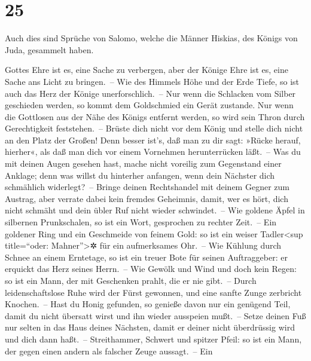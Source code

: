 \hypertarget{section-24}{%
\section{25}\label{section-24}}

Auch dies sind Sprüche von Salomo, welche die Männer
Hiskias, des Königs von Juda, gesammelt haben.

Gottes Ehre ist es, eine Sache zu verbergen, aber der
Könige Ehre ist es, eine Sache ans Licht zu bringen.~--
Wie des Himmels Höhe und der Erde Tiefe, so ist auch das
Herz der Könige unerforschlich.~-- Nur wenn die Schlacken
vom Silber geschieden werden, so kommt dem Goldschmied ein Gerät
zustande. Nur wenn die Gottlosen aus der Nähe des Königs
entfernt werden, so wird sein Thron durch Gerechtigkeit feststehen.~--
Brüste dich nicht vor dem König und stelle dich nicht an
den Platz der Großen! Denn besser ist's, daß man zu dir
sagt: »Rücke herauf, hierher«, als daß man dich vor einem Vornehmen
herunterrücken läßt.~-- Was du mit deinen Augen gesehen
hast, mache nicht voreilig zum Gegenstand einer Anklage; denn was willst
du hinterher anfangen, wenn dein Nächster dich schmählich widerlegt?~--
Bringe deinen Rechtshandel mit deinem Gegner zum Austrag,
aber verrate dabei kein fremdes Geheimnis, damit, wer es
hört, dich nicht schmäht und dein übler Ruf nicht wieder schwindet.~--
Wie goldene Äpfel in silbernen Prunkschalen, so ist ein
Wort, gesprochen zu rechter Zeit.~-- Ein goldener Ring
und ein Geschmeide von feinem Gold: so ist ein weiser
Tadler\textless sup title=``oder: Mahner''\textgreater✲ für ein
aufmerksames Ohr.~-- Wie Kühlung durch Schnee an einem
Erntetage, so ist ein treuer Bote für seinen Auftraggeber: er erquickt
das Herz seines Herrn.~-- Wie Gewölk und Wind und doch
kein Regen: so ist ein Mann, der mit Geschenken prahlt, die er nie
gibt.~-- Durch leidenschaftslose Ruhe wird der Fürst
gewonnen, und eine sanfte Zunge zerbricht Knochen.~--
Hast du Honig gefunden, so genieße davon nur ein genügend
Teil, damit du nicht übersatt wirst und ihn wieder ausspeien mußt.~--
Setze deinen Fuß nur selten in das Haus deines Nächsten,
damit er deiner nicht überdrüssig wird und dich dann haßt.~--
Streithammer, Schwert und spitzer Pfeil: so ist ein Mann,
der gegen einen andern als falscher Zeuge aussagt.~-- Ein
